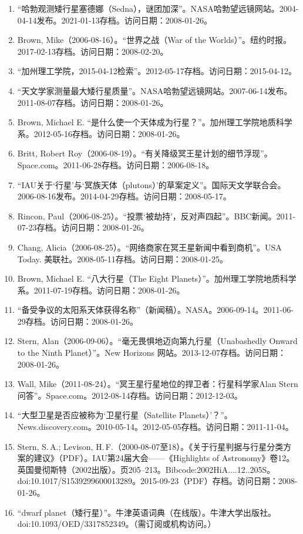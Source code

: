 \begin{enumerate}
\item “哈勃观测矮行星塞德娜（Sedna），谜团加深”。NASA哈勃望远镜网站。2004-04-14发布。2021-01-13存档。访问日期：2008-01-26。
\item Brown, Mike（2006-08-16）。“世界之战（War of the Worlds）”。纽约时报。2017-02-13存档。访问日期：2008-02-20。
\item “加州理工学院，2015-04-12检索”。2012-05-17存档。访问日期：2015-04-12。
\item “天文学家测量最大矮行星质量”。NASA哈勃望远镜网站。2007-06-14发布。2011-08-07存档。访问日期：2008-01-26。
\item Brown, Michael E. “是什么使一个天体成为行星？”。加州理工学院地质科学系。2012-05-16存档。访问日期：2008-01-26。
\item Britt, Robert Roy（2006-08-19）。“有关降级冥王星计划的细节浮现”。Space.com。2011-06-28存档。访问日期：2006-08-18。
\item “IAU关于‘行星’与‘冥族天体（plutons）’的草案定义”。国际天文学联合会。2006-08-16发布。2014-04-29存档。访问日期：2008-05-17。
\item Rincon, Paul（2006-08-25）。“投票‘被劫持’，反对声四起”。BBC新闻。2011-07-23存档。访问日期：2008-01-26。
\item Chang, Alicia（2006-08-25）。“网络商家在冥王星新闻中看到商机”。USA Today. 美联社。2008-05-11存档。访问日期：2008-01-25。
\item Brown, Michael E. “八大行星（The Eight Planets）”。加州理工学院地质科学系。2011-07-19存档。访问日期：2008-01-26。
\item “备受争议的太阳系天体获得名称”（新闻稿）。NASA。2006-09-14。2011-06-29存档。访问日期：2008-01-26。
\item Stern, Alan（2006-09-06）。“毫无畏惧地迈向第九行星（Unabashedly Onward to the Ninth Planet）”。New Horizons 网站。2013-12-07存档。访问日期：2008-01-26。
\item Wall, Mike（2011-08-24）。“冥王星行星地位的捍卫者：行星科学家Alan Stern问答”。Space.com。2012-08-14存档。访问日期：2012-12-03。
\item “大型卫星是否应被称为‘卫星行星（Satellite Planets）’？”。News.discovery.com。2010-05-14。2012-05-05存档。访问日期：2011-11-04。
\item Stern, S.\,A.; Levison, H.\,F.（2000-08-07至18）。《关于行星判据与行星分类方案的建议》（PDF）。IAU第24届大会——《Highlights of Astronomy》卷12。英国曼彻斯特（2002出版）。页205–213。Bibcode:2002HiA....12..205S。doi:10.1017/S1539299600013289。2015-09-23（PDF）存档。访问日期：2008-01-26。
\item “dwarf planet（矮行星）”。牛津英语词典（在线版）。牛津大学出版社。doi:10.1093/OED/3317852349。（需订阅或机构访问。）

\end{enumerate}
